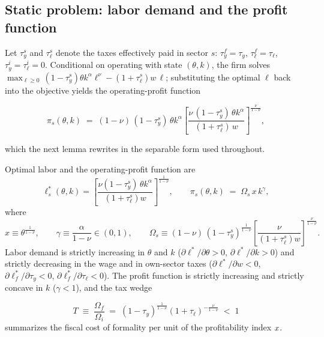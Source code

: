 \documentclass[12pt]{article}
\begin{document}
\subsection{Static problem: labor demand and the profit function}
\label{sec:toy-static}
 
Let $\tau_y^{s}$ and $\tau_{\ell}^{s}$ denote the taxes effectively paid in sector $s$: $\tau_y^{f}=\tau_y$, $\tau_{\ell}^{f}=\tau_{\ell}$, $\tau_y^{i}=\tau_{\ell}^{i}=0$. Conditional on operating with state $(\theta,k)$, the firm solves $\max_{\ell\geq0}\,(1-\tau_y^{s})\theta k^{\alpha}\ell^{\nu} - (1+\tau_{\ell}^{s})w\,\ell$; substituting the optimal $\ell$ back into the objective yields the operating-profit function

\begin{equation*}
  \pi_{s}(\theta,k)
  \;=\;(1-\nu)\,(1-\tau_y^{s})\,\theta k^{\alpha}
  \left[\frac{\nu\,(1-\tau_y^{s})\,\theta k^{\alpha}}
             {(1+\tau_{\ell}^{s})\,w}\right]^{\frac{\nu}{1-\nu}},
\end{equation*}

which the next lemma rewrites in the separable form used throughout.
 
\begin{lemma}
\label{lem:static}
Optimal labor and the operating-profit function are
\begin{equation}
  \ell^{*}_{s}(\theta,k)
  = \left[\frac{\nu(1-\tau_y^{s})\,\theta k^{\alpha}}
                {(1+\tau_{\ell}^{s})w}\right]^{\frac{1}{1-\nu}},
  \qquad
  \pi_{s}(\theta,k) \;=\; \Omega_{s}\,x\,k^{\gamma},
  \label{eq:toy-profit}
\end{equation}
where
\begin{equation}
  x \equiv \theta^{\frac{1}{1-\nu}},\qquad
  \gamma \equiv \frac{\alpha}{1-\nu}\in(0,1),\qquad
  \Omega_{s} \equiv (1-\nu)\,(1-\tau_y^{s})^{\frac{1}{1-\nu}}
  \left[\frac{\nu}{(1+\tau_{\ell}^{s})w}\right]^{\frac{\nu}{1-\nu}} .
  \label{eq:toy-omega}
\end{equation}
 Labor demand is strictly increasing in $\theta$ and $k$ ($\partial\ell^{*}/\partial\theta>0$, $\partial\ell^{*}/\partial k>0$) and strictly decreasing in the wage and in own-sector taxes ($\partial\ell^{*}/\partial w<0$, $\partial\ell^{*}_{f}/\partial\tau_y<0$, $\partial\ell^{*}_{f}/\partial\tau_{\ell}<0$). The profit function is strictly increasing and strictly concave in $k$ ($\gamma<1$), and the tax wedge
 
\begin{equation}
  T \;\equiv\; \frac{\Omega_{f}}{\Omega_{i}}
  \;=\; (1-\tau_y)^{\frac{1}{1-\nu}} (1+\tau_{\ell})^{-\frac{\nu}{1-\nu}}
  \;<\;1
  \label{eq:toy-T}
\end{equation}
summarizes the fiscal cost of formality per unit of the profitability
index $x$.
\end{lemma}
 
\end{document}
